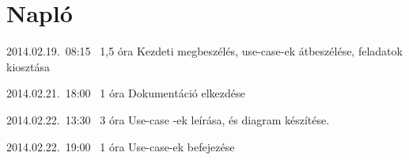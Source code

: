 %
\section{Napló}

\begin{naplo}

\bejegyzes
{2014.02.19.~08:15~}
{1,5 óra}
{\adam\newline
\antal\newline
\bator\newline
\torok}
{Kezdeti megbeszélés, use-case-ek átbeszélése, feladatok kiosztása}

\bejegyzes
{2014.02.21.~18:00~} %
{1 óra} %
{\antal} %
{Dokumentáció elkezdése} %

\bejegyzes
{2014.02.22.~13:30~}
{3 óra}
{\adam}
{Use-case -ek leírása, és diagram készítése.}

\bejegyzes
{2014.02.22.~19:00~}
{1 óra}
{\adam}
{Use-case-ek befejezése}


\end{naplo}

